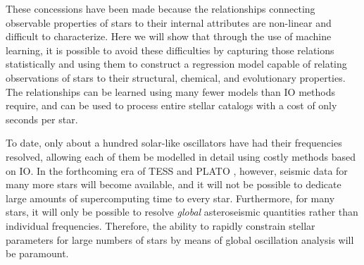 \documentclass[manuscript,linenumbers]{aastex6}
\begin{document}

These concessions have been made because the relationships connecting observable properties of stars to their internal attributes are non-linear and difficult to characterize. Here we will show that through the use of machine learning, it is possible to avoid these difficulties by capturing those relations statistically and using them to construct a regression model capable of relating observations of stars to their structural, chemical, and evolutionary properties. The relationships can be learned using many fewer models than IO methods require, and can be used to process entire stellar catalogs with a cost of only seconds per star. 

To date, only about a hundred solar-like oscillators have had their frequencies resolved, allowing each of them be modelled in detail using costly methods based on IO. In the forthcoming era of TESS \citep{2015JATIS...1a4003R} and PLATO \citep{2014ExA....38..249R}, however, seismic data for many more stars will become available, and it will not be possible to dedicate large amounts of supercomputing time to every star. Furthermore, for many stars, it will only be possible to resolve \emph{global} asteroseismic quantities rather than individual frequencies. Therefore, the ability to rapidly constrain stellar parameters for large numbers of stars by means of global oscillation analysis will be paramount. 
\end{document}
